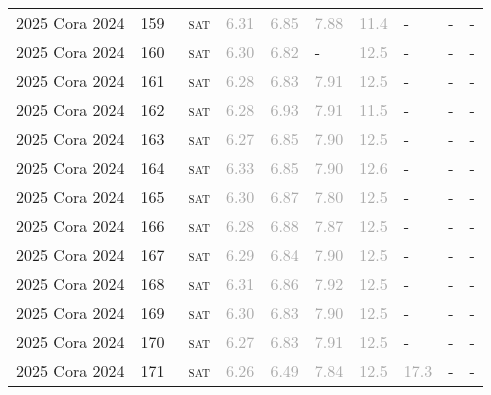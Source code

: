 \begin{center}
{\begin{longtable}{@{}llllllllll@{}}
2025 Cora 2024 & 159 & ~\textsc{sat} & \textcolor{darkgray}{6.31} & \textcolor{darkgray}{6.85} & \textcolor{darkgray}{7.88} & \textcolor{darkgray}{11.4} & - & - & - \\
2025 Cora 2024 & 160 & ~\textsc{sat} & \textcolor{darkgray}{6.30} & \textcolor{darkgray}{6.82} & - & \textcolor{darkgray}{12.5} & - & - & - \\
2025 Cora 2024 & 161 & ~\textsc{sat} & \textcolor{darkgray}{6.28} & \textcolor{darkgray}{6.83} & \textcolor{darkgray}{7.91} & \textcolor{darkgray}{12.5} & - & - & - \\
2025 Cora 2024 & 162 & ~\textsc{sat} & \textcolor{darkgray}{6.28} & \textcolor{darkgray}{6.93} & \textcolor{darkgray}{7.91} & \textcolor{darkgray}{11.5} & - & - & - \\
2025 Cora 2024 & 163 & ~\textsc{sat} & \textcolor{darkgray}{6.27} & \textcolor{darkgray}{6.85} & \textcolor{darkgray}{7.90} & \textcolor{darkgray}{12.5} & - & - & - \\
2025 Cora 2024 & 164 & ~\textsc{sat} & \textcolor{darkgray}{6.33} & \textcolor{darkgray}{6.85} & \textcolor{darkgray}{7.90} & \textcolor{darkgray}{12.6} & - & - & - \\
2025 Cora 2024 & 165 & ~\textsc{sat} & \textcolor{darkgray}{6.30} & \textcolor{darkgray}{6.87} & \textcolor{darkgray}{7.80} & \textcolor{darkgray}{12.5} & - & - & - \\
2025 Cora 2024 & 166 & ~\textsc{sat} & \textcolor{darkgray}{6.28} & \textcolor{darkgray}{6.88} & \textcolor{darkgray}{7.87} & \textcolor{darkgray}{12.5} & - & - & - \\
2025 Cora 2024 & 167 & ~\textsc{sat} & \textcolor{darkgray}{6.29} & \textcolor{darkgray}{6.84} & \textcolor{darkgray}{7.90} & \textcolor{darkgray}{12.5} & - & - & - \\
2025 Cora 2024 & 168 & ~\textsc{sat} & \textcolor{darkgray}{6.31} & \textcolor{darkgray}{6.86} & \textcolor{darkgray}{7.92} & \textcolor{darkgray}{12.5} & - & - & - \\
2025 Cora 2024 & 169 & ~\textsc{sat} & \textcolor{darkgray}{6.30} & \textcolor{darkgray}{6.83} & \textcolor{darkgray}{7.90} & \textcolor{darkgray}{12.5} & - & - & - \\
2025 Cora 2024 & 170 & ~\textsc{sat} & \textcolor{darkgray}{6.27} & \textcolor{darkgray}{6.83} & \textcolor{darkgray}{7.91} & \textcolor{darkgray}{12.5} & - & - & - \\
2025 Cora 2024 & 171 & ~\textsc{sat} & \textcolor{darkgray}{6.26} & \textcolor{darkgray}{6.49} & \textcolor{darkgray}{7.84} & \textcolor{darkgray}{12.5} & \textcolor{darkgray}{17.3} & - & - \\

\end{longtable}}
\end{center}
